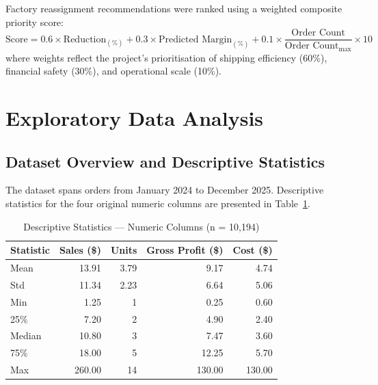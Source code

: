 \documentclass[12pt, a4paper]{article}
\begin{document}
Factory reassignment recommendations were ranked using a weighted
composite priority score:
\begin{equation}
    \text{Score} = 0.6 \times \text{Reduction}_{(\%)}
                 + 0.3 \times \text{Predicted Margin}_{(\%)}
                 + 0.1 \times \frac{\text{Order Count}}
                                   {\text{Order Count}_{\max}} \times 10
    \label{eq:score}
\end{equation}
where weights reflect the project's prioritisation of shipping
efficiency (60\%), financial safety (30\%), and operational scale (10\%).

\section{Exploratory Data Analysis}
\label{sec:eda}

\subsection{Dataset Overview and Descriptive Statistics}

The dataset spans orders from January 2024 to December 2025.
Descriptive statistics for the four original numeric columns are
presented in Table~\ref{tab:desc}.

\begin{table}[H]
\centering
\caption{Descriptive Statistics --- Numeric Columns (n = 10,194)}
\label{tab:desc}
\renewcommand{\arraystretch}{1.12}
\begin{tabular}{lrrrr}
\toprule
\textbf{Statistic} & \textbf{Sales (\$)} & \textbf{Units}
    & \textbf{Gross Profit (\$)} & \textbf{Cost (\$)} \\
\midrule
Mean   & 13.91  & 3.79 & 9.17  & 4.74  \\
Std    & 11.34  & 2.23 & 6.64  & 5.06  \\
Min    & 1.25   & 1    & 0.25  & 0.60  \\
25\%   & 7.20   & 2    & 4.90  & 2.40  \\
Median & 10.80  & 3    & 7.47  & 3.60  \\
75\%   & 18.00  & 5    & 12.25 & 5.70  \\
Max    & 260.00 & 14   & 130.00 & 130.00 \\
\bottomrule
\end{tabular}
\end{table}
\end{document}
